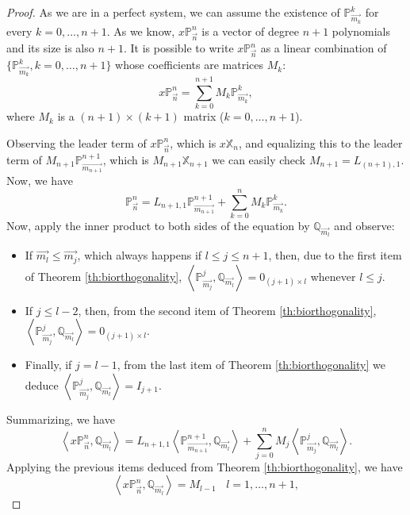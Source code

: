 \documentclass[12pt,a4]{article}
\theoremstyle{plain}
\newcommand{\prodesc}[2]{\left\langle #1 , #2 \right\rangle}
\begin{document}
\begin{proof}
    As we are in a perfect system, we can assume the existence of $\mathbb P_{\overrightarrow{m_k}}^k$ for every $k=0,\dots,n+1$. As we know, $x\mathbb P_{\vec n}^n$ is a vector of degree $n+1$ polynomials and its size is also $n+1$. It is possible to write  $x\mathbb P_{\vec n}^n$ as a linear combination of $\{\mathbb P_{\overrightarrow{m_k}}^k, k=0,\dots,n+1\}$ whose coefficients are matrices $M_k$:
    $$
    x\mathbb P_{\overrightarrow{n}}^n = \sum_{k=0}^{n+1} M_k \mathbb P_{\overrightarrow{m_k}}^k,
    $$
    where $M_k$ is a $(n+1)\times(k+1)$ matrix ($k=0,\dots,n+1$).

    Observing the leader term of $x\mathbb P_{\overrightarrow{n}}^n$, which is $x\mathbb X_{n}$, and equalizing this to the leader term of $M_{n+1} \mathbb P_{\overrightarrow{m_{n+1}}}^{n+1}$, which is $M_{n+1}\mathbb X_{n+1}$ we can easily check $M_{n+1}=L_{(n+1),1}$. Now, we have
    $$
    \mathbb P_{\overrightarrow{n}}^n = L_{n+1,1}\mathbb P_{\overrightarrow{m_{n+1}}}^{n+1} + \sum_{k=0}^{n} M_k \mathbb P_{\overrightarrow{m_k}}^k.
    $$
    Now, apply the inner product to both sides of the equation by $\mathbb Q_{\overrightarrow{m_l}}$ and observe:
    \begin{itemize}
        \item If $\overrightarrow{m_l}\leq \overrightarrow{m_j}$, which always happens if $l\leq j\leq n+1$, then, due to the first item of Theorem \ref{th:biorthogonality}, $\prodesc{\mathbb P_{\overrightarrow{m_j}}^j}{\mathbb Q_{\overrightarrow{m_l}}} = 0_{(j+1)\times l}$ whenever $l\leq j$.
        \item If $j\leq l-2$, then, from the second item of Theorem \ref{th:biorthogonality}, $\prodesc{\mathbb P_{\overrightarrow{m_j}}^j}{\mathbb Q_{\overrightarrow{m_l}}} = 0_{(j+1)\times l}.$
        \item Finally, if $j=l-1$, from the last item of Theorem \ref{th:biorthogonality} we deduce $\prodesc{\mathbb P_{\overrightarrow{m_j}}^j}{\mathbb Q_{\overrightarrow{m_l}}} = I_{j+1}.$
    \end{itemize}

    Summarizing, we have
    $$
    \prodesc{x\mathbb P_{\vec n}^n}{\mathbb Q_{\overrightarrow{m_l}}} = L_{n+1,1}\prodesc{\mathbb P_{\overrightarrow{m_{n+1}}}^{n+1}}{\mathbb Q_{\overrightarrow{m_l}}} + \sum_{j=0}^n M_j \prodesc{\mathbb P_{\overrightarrow{m_j}}^j}{\mathbb Q_{\overrightarrow{m_l}}}.
    $$
    Applying the previous items deduced from Theorem \ref{th:biorthogonality}, we have
    \begin{equation}
        \label{eq:biorthogonality-1}
        \prodesc{x\mathbb P_{\vec n}^n}{\mathbb Q_{\overrightarrow{m_l}}} = M_{l-1} \ \ \ \ l=1,\dots,n+1,
    \end{equation}


\end{proof}
\end{document}

